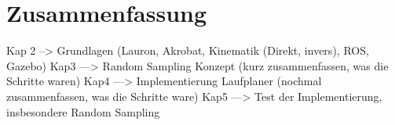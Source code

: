 \chapter{Zusammenfassung}
\label{kap6}

Kap 2 --> Grundlagen (Lauron, Akrobat, Kinematik (Direkt, invers), ROS, Gazebo)
Kap3 ---> Random Sampling Konzept (kurz zusammenfassen, was die Schritte waren)
Kap4 ---> Implementierung Laufplaner (nochmal zusammenfassen, was die Schritte ware)
Kap5 ---> Test der Implementierung, insbesondere Random Sampling